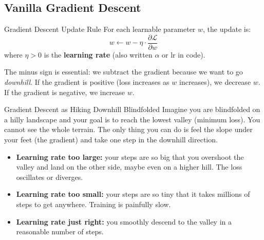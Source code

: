 \subsection{Vanilla Gradient Descent}

\begin{mathbox}{Gradient Descent Update Rule}
For each learnable parameter $w$, the update is:
\begin{equation}
    w \leftarrow w - \eta \cdot \frac{\partial \mathcal{L}}{\partial w}
\end{equation}
where $\eta > 0$ is the \textbf{learning rate} (also written $\alpha$ or $\text{lr}$ in code).
\end{mathbox}

The minus sign is essential: we subtract the gradient because we want to go \emph{downhill}. If the gradient is positive (loss increases as $w$ increases), we decrease $w$. If the gradient is negative, we increase $w$.

\begin{analogybox}{Gradient Descent as Hiking Downhill Blindfolded}
Imagine you are blindfolded on a hilly landscape and your goal is to reach the lowest valley (minimum loss). You cannot see the whole terrain. The only thing you can do is feel the slope under your feet (the gradient) and take one step in the downhill direction.

\begin{itemize}
    \item \textbf{Learning rate too large:} your steps are so big that you overshoot the valley and land on the other side, maybe even on a higher hill. The loss oscillates or diverges.
    \item \textbf{Learning rate too small:} your steps are so tiny that it takes millions of steps to get anywhere. Training is painfully slow.
    \item \textbf{Learning rate just right:} you smoothly descend to the valley in a reasonable number of steps.
\end{itemize}
\end{analogybox}

